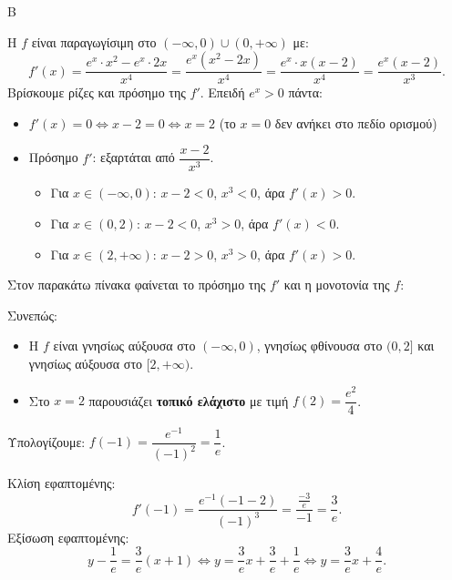 \begin{thema}{Β}
\begin{erwthma}
\item Η $f$ είναι παραγωγίσιμη στο $(-\infty,0)\cup(0,+\infty)$ με:
\[
f'(x) = \frac{e^x \cdot x^2 - e^x \cdot 2x}{x^4} = \frac{e^x(x^2 - 2x)}{x^4} = \frac{e^x \cdot x(x-2)}{x^4} = \frac{e^x(x-2)}{x^3}.
\]
Βρίσκουμε ρίζες και πρόσημο της $f'$. Επειδή $e^x > 0$ πάντα:
\begin{itemize}
    \item $f'(x) = 0 \Leftrightarrow x - 2 = 0 \Leftrightarrow x = 2$ \quad (το $x=0$ δεν ανήκει στο πεδίο ορισμού)
    \item Πρόσημο $f'$: εξαρτάται από $\dfrac{x-2}{x^3}$.
    \begin{itemize}
        \item Για $x \in (-\infty, 0)$: $x-2 < 0$, $x^3 < 0$, άρα $f'(x) > 0$.
        \item Για $x \in (0, 2)$: $x-2 < 0$, $x^3 > 0$, άρα $f'(x) < 0$.
        \item Για $x \in (2, +\infty)$: $x-2 > 0$, $x^3 > 0$, άρα $f'(x) > 0$.
    \end{itemize}
\end{itemize}
Στον παρακάτω πίνακα φαίνεται το πρόσημο της $f'$ και η μονοτονία της $f$:
\begin{center}
\end{center}
Συνεπώς:
\begin{itemize}
    \item Η $f$ είναι γνησίως αύξουσα στο $(-\infty, 0)$, γνησίως φθίνουσα στο $(0, 2]$ και γνησίως αύξουσα στο $[2, +\infty)$.
    \item Στο $x = 2$ παρουσιάζει \textbf{τοπικό ελάχιστο} με τιμή $f(2) = \dfrac{e^2}{4}$.
\end{itemize}

\item Υπολογίζουμε: $f(-1) = \dfrac{e^{-1}}{(-1)^2} = \dfrac{1}{e}$.

Κλίση εφαπτομένης:
\[
f'(-1) = \frac{e^{-1}(-1-2)}{(-1)^3} = \frac{\frac{-3}{e}}{-1} = \frac{3}{e}.
\]
Εξίσωση εφαπτομένης:
\[
y - \frac{1}{e} = \frac{3}{e}(x+1) \Leftrightarrow y = \frac{3}{e}x + \frac{3}{e} + \frac{1}{e} \Leftrightarrow y = \frac{3}{e}x + \frac{4}{e}.
\]


\end{erwthma}
\end{thema}
